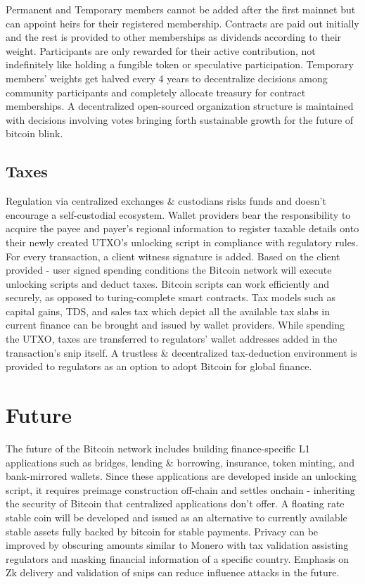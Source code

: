 \documentclass[a4paper, 10pt]{extarticle}
\begin{document}
 Permanent and Temporary members cannot be added after the first mainnet but can appoint heirs for their registered membership. Contracts are paid out initially and the rest is provided to other memberships as dividends according to their weight. Participants are only rewarded for their active contribution, not indefinitely like holding a fungible token or speculative participation. Temporary members' weights get halved every 4 years to decentralize decisions among community participants and completely allocate treasury for contract memberships. A decentralized open-sourced organization structure is maintained with decisions involving votes bringing forth sustainable growth for the future of bitcoin blink.
\subsection{Taxes}
Regulation via centralized exchanges \& custodians risks funds and doesn't encourage a self-custodial ecosystem. Wallet providers bear the responsibility to acquire the payee and payer's regional information to register taxable details onto their newly created UTXO's unlocking script in compliance with regulatory rules. For every transaction, a client witness signature is added. Based on the client provided - user signed spending conditions the Bitcoin network will execute unlocking scripts and deduct taxes. Bitcoin scripts can work efficiently and securely, as opposed to turing-complete smart contracts. Tax models such as capital gains, TDS, and sales tax which depict all the available tax slabs in current finance can be brought and issued by wallet providers. While spending the UTXO, taxes are transferred to regulators' wallet addresses added in the transaction's snip itself. A trustless \& decentralized tax-deduction environment is provided to regulators as an option to adopt Bitcoin for global finance.
\section{Future}
The future of the Bitcoin network includes building finance-specific L1 applications such as bridges, lending \& borrowing, insurance, token minting, and bank-mirrored wallets. Since these applications are developed inside an unlocking script, it requires preimage construction off-chain and settles onchain - inheriting the security of Bitcoin that centralized applications don't offer. A floating rate stable coin \cite{stablecoin} will be developed and issued as an alternative to currently available stable assets fully backed by bitcoin for stable payments. Privacy can be improved by obscuring amounts similar to Monero \cite{moneroct} with tax validation assisting regulators and masking financial information of a specific country. Emphasis on Zk delivery and validation of snips can reduce influence attacks in the future.
\end{document}
